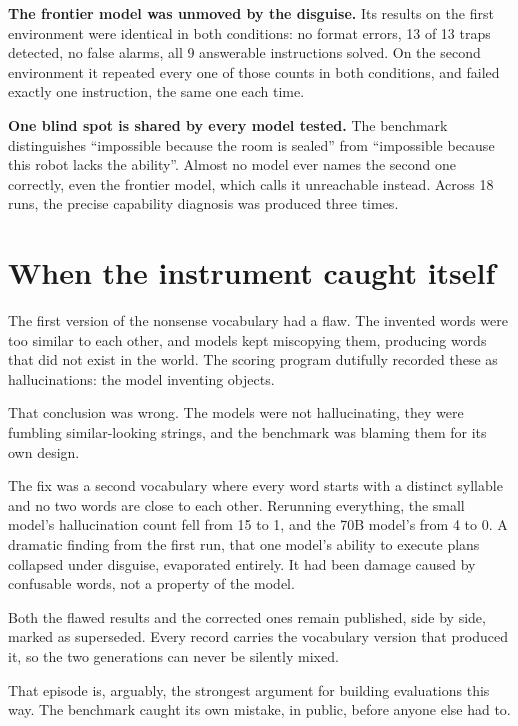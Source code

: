 \documentclass[11pt,a4paper]{article}
\begin{document}
\textbf{The frontier model was unmoved by the disguise.} Its results on the first environment were identical in both conditions: no format errors, 13 of 13 traps detected, no false alarms, all 9 answerable instructions solved. On the second environment it repeated every one of those counts in both conditions, and failed exactly one instruction, the same one each time.

\textbf{One blind spot is shared by every model tested.} The benchmark distinguishes ``impossible because the room is sealed'' from ``impossible because this robot lacks the ability''. Almost no model ever names the second one correctly, even the frontier model, which calls it unreachable instead. Across 18 runs, the precise capability diagnosis was produced three times.

\section{When the instrument caught itself}

The first version of the nonsense vocabulary had a flaw. The invented words were too similar to each other, and models kept miscopying them, producing words that did not exist in the world. The scoring program dutifully recorded these as hallucinations: the model inventing objects.

That conclusion was wrong. The models were not hallucinating, they were fumbling similar-looking strings, and the benchmark was blaming them for its own design.

The fix was a second vocabulary where every word starts with a distinct syllable and no two words are close to each other. Rerunning everything, the small model's hallucination count fell from 15 to 1, and the 70B model's from 4 to 0. A dramatic finding from the first run, that one model's ability to execute plans collapsed under disguise, evaporated entirely. It had been damage caused by confusable words, not a property of the model.

\begin{quotebox}
Both the flawed results and the corrected ones remain published, side by side, marked as superseded. Every record carries the vocabulary version that produced it, so the two generations can never be silently mixed.
\end{quotebox}

That episode is, arguably, the strongest argument for building evaluations this way. The benchmark caught its own mistake, in public, before anyone else had to.
\end{document}
